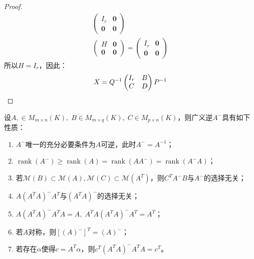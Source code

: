 \begin{proof}
\begin{gather*}
		\begin{pmatrix}
			I_r & \mathbf{0} \\
			\mathbf{0} & \mathbf{0}
		\end{pmatrix} \\
		\begin{pmatrix}
			H & \mathbf{0} \\
			\mathbf{0} & \mathbf{0}
		\end{pmatrix}
		=
		\begin{pmatrix}
			I_r & \mathbf{0} \\
			\mathbf{0} & \mathbf{0}
		\end{pmatrix}
	\end{gather*}
	所以$H=I_r$，因此：
	\begin{equation*}
		X=Q^{-1}
		\begin{pmatrix}
			I_r & B \\
			C & D
		\end{pmatrix}
		P^{-1}\qedhere
	\end{equation*}
\end{proof}
\begin{property}\label{prop:A-}
	设$A,\in M_{m\times n}(K),\;B\in M_{m\times q}(K),\;C\in M_{p\times n}(K)$，则广义逆$A^-$具有如下性质：
	\begin{enumerate}
		\item $A^-$唯一的充分必要条件为$A$可逆，此时$A^-=A^{-1}$；
		\item $\operatorname{rank}(A^-)\geqslant\operatorname{rank}(A)=\operatorname{rank}(AA^-)=\operatorname{rank}(A^-A)$；
		\item 若$\mathcal{M}(B)\subset\mathcal{M}(A),\mathcal{M}(C)\subset\mathcal{M}(A^T)$，则$C^TA^-B$与$A^-$的选择无关；
		\item $A(A^TA)^-A^T$与$(A^TA)^-$的选择无关；
		\item $A(A^TA)^-A^TA=A,\;A^TA(A^TA)^-A^T=A^T$；
		\item 若$A$对称，则$[(A)^-]^T=(A)^-$；
		\item 若存在$\alpha$使得$c=A^T\alpha$，则$c^T(A^TA)^-A^TA=c^T$。
	\end{enumerate}
\end{property}
